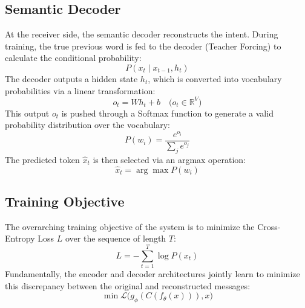 \documentclass[12pt, a4paper, twocolumn]{article}
\begin{document}
\subsection{\textbf{Semantic Decoder}}
At the receiver side, the semantic decoder reconstructs the intent. During training, the true previous word is fed to the decoder (Teacher Forcing) to calculate the conditional probability:
\begin{equation}
    P(x_t \mid x_{t-1}, h_t)
\end{equation}
The decoder outputs a hidden state $h_t$, which is converted into vocabulary probabilities via a linear transformation:
\begin{equation}
    o_t = W h_t + b \quad \Big( o_t \in \mathbb{R}^V \Big)
\end{equation}
This output $o_t$ is pushed through a Softmax function to generate a valid probability distribution over the vocabulary:
\begin{equation}
    P(w_i) = \frac{e^{o_i}}{\sum_j e^{o_j}}
\end{equation}
The predicted token $\hat{x}_t$ is then selected via an argmax operation:
\begin{equation}
    \hat{x}_t = \arg \max P(w_i)
\end{equation}

\subsection{\textbf{Training Objective}}
The overarching training objective of the system is to minimize the Cross-Entropy Loss $L$ over the sequence of length $T$:
\begin{equation}
    L = - \sum_{t=1}^T \log P(x_t)
\end{equation}
Fundamentally, the encoder and decoder architectures jointly learn to minimize this discrepancy between the original and reconstructed messages:
\begin{equation}
    \min \mathcal{L} \big( g_\phi(C(f_\theta(x))), x \big)
\end{equation}
\end{document}
